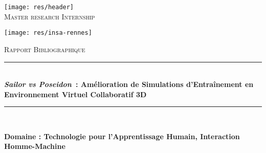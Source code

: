 \documentclass[11pt]{article}
\newcommand{\HRule}{\rule{\linewidth}{0.5mm}}
\begin{document}
\begin{titlepage}

\begin{center}


 

\texttt{[image: res/header]}\\[1cm]
\textsc{\Large Master research Internship}
\vspace{1cm}


\texttt{[image: res/insa-rennes]}

  
\vspace{1cm} 
\textsc{\Large Rapport Bibliographique }\\[0.5cm]


\HRule \\[0.4cm]
{ \Large \bfseries \textit{Sailor vs Poseidon}~: Amélioration de Simulations d'Entraînement en Environnement Virtuel Collaboratif 3D }\\[0.4cm]

\HRule \\[1.5cm]
\begin{flushleft}
\textbf{Domaine : Technologie pour l'Apprentissage Humain, Interaction Homme-Machine }
\end{flushleft}


\end{center}
\end{titlepage}
\end{document}
